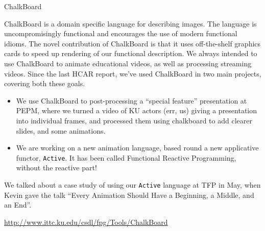\documentclass{article}
\begin{document}
\begin{hcarentry}{ChalkBoard}
\makeheader

ChalkBoard is a domain specific language for describing images. 
The language is uncompromisingly functional
and encourages the use of modern functional idioms.
The novel contribution of ChalkBoard is that it uses off-the-shelf
graphics cards to speed up rendering of our functional description.
We always intended to use ChalkBoard to animate educational
videos, as well as processing streaming videos.
Since the last HCAR report, we've used ChalkBoard in two main projects,
covering both these goals.
\begin{itemize}
\item We use ChalkBoard to post-processing a
``special feature'' presentation at PEPM, where we turned
a video of KU actors (err, us) giving a presentation into individual frames,
and processed them using chalkboard to add clearer slides, and some animations.
\item We are working on a new animation language, based round a new applicative
functor, \verb|Active|. It has been called Functional Reactive Programming,
without the reactive part!
\end{itemize}

We talked about a case study of using our \verb|Active| language at TFP in May,
when Kevin gave the talk ``Every Animation Should Have a Beginning, a Middle, and an End''.

\FurtherReading
  \url{http://www.ittc.ku.edu/csdl/fpg/Tools/ChalkBoard}

\end{hcarentry}
\end{document}
